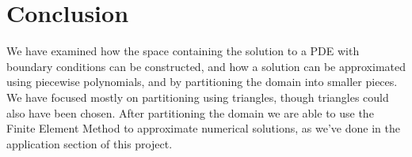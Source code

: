 \chapter{Conclusion}
We have examined how the space containing the solution to a PDE 
with boundary conditions can be constructed, and how a solution can be 
approximated using piecewise polynomials, and by partitioning the domain 
into smaller pieces.
We have focused mostly on partitioning using triangles, though triangles could 
also have been chosen.
After partitioning the domain we are able to use the Finite Element Method to approximate numerical solutions, 
as we've done in the application section of this project.